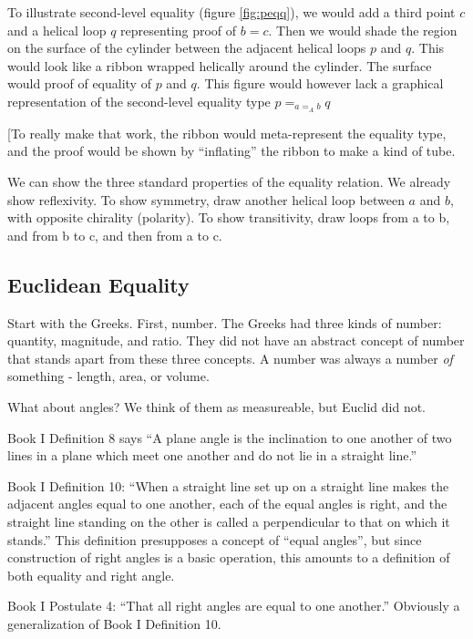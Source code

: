 \documentclass{article}
\begin{document}
To illustrate second-level equality (figure \ref{fig:peqq}), we would
add a third point \(c\) and a helical loop \(q\) representing proof of
\(b=c\). Then we would shade the region on the surface of the cylinder
between the adjacent helical loops \(p\) and \(q\). This would look
like a ribbon wrapped helically around the cylinder. The surface would
proof of equality of \(p\) and \(q\). This figure would however lack a
graphical representation of the second-level equality type \(p =_{a=_A
  b} q\)

[To really make that work, the ribbon would meta-represent the
  equality type, and the proof would be shown by ``inflating'' the
  ribbon to make a kind of tube.

We can show the three standard properties of the equality relation. We
already show reflexivity. To show symmetry, draw another helical loop
between \(a\) and \(b\), with opposite chirality (polarity). To show
transitivity, draw loops from a to b, and from b to c, and then from a
to c.

\subsection{Euclidean Equality \\}

Start with the Greeks. First, number. The Greeks had three kinds of
number: quantity, magnitude, and ratio. They did not have an abstract
concept of number that stands apart from these three concepts. A
number was always a number \textit{of} something - length, area, or
volume.

What about angles? We think of them as measureable, but Euclid did
not.

Book I Definition 8 says \enquote{A plane angle is the
  inclination to one another of two lines in a plane which meet one
  another and do not lie in a straight line.}

Book I Definition 10: \enquote{When a straight line set up on a
  straight line makes the adjacent angles equal to one another, each
  of the equal angles is right, and the straight line standing on the
  other is called a perpendicular to that on which it stands.} This
definition presupposes a concept of ``equal angles'', but since
construction of right angles is a basic operation, this amounts to a
definition of both equality and right angle.

Book I Postulate 4: \enquote{That all right angles are equal to one another.}
Obviously a generalization of Book I Definition 10.
\end{document}
